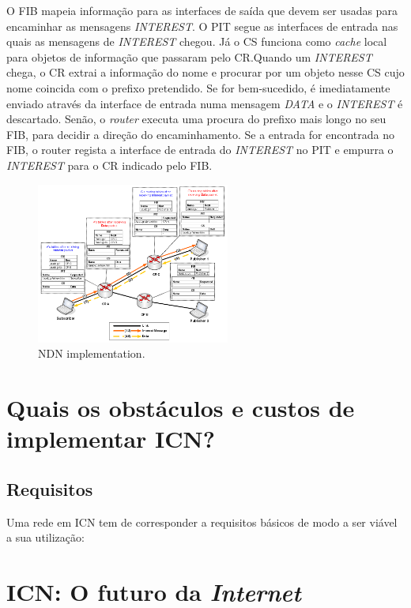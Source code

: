 \documentclass[conference]{IEEEtran}
\begin{document}
O FIB mapeia informa\c{c}\~{a}o para as interfaces de sa\'{i}da que devem ser usadas para encaminhar as mensagens \textit{INTEREST}. O PIT segue as interfaces de entrada nas quais as mensagens de \textit{INTEREST} chegou. J\'{a} o CS funciona como \textit{cache} local para objetos de informa\c{c}\~{a}o que passaram pelo CR.Quando um \textit{INTEREST} chega, o CR extrai a informa\c{c}\~{a}o do nome e procurar por um objeto nesse CS cujo nome coincida com o prefixo pretendido. Se for bem-sucedido, \'{e} imediatamente enviado atrav\'{e}s da interface de entrada numa mensagem \textit{DATA} e o \textit{INTEREST} \'{e} descartado. Sen\~{a}o, o \textit{router} executa uma procura do prefixo mais longo no seu FIB, para decidir a dire\c{c}\~{a}o do encaminhamento. Se a entrada for encontrada no FIB, o router regista a interface de entrada do \textit{INTEREST} no PIT e empurra o \textit{INTEREST} para o CR indicado pelo FIB.\\

\begin{figure}[h]
\centering
\includegraphics[width=2.5in]{ndn}
\caption{NDN implementation.}
\label{dona}
\end{figure}
\section{Quais os obst\'{a}culos e custos de implementar ICN?}

\subsection{Requisitos}

Uma rede em ICN tem de corresponder a requisitos b\'{a}sicos de modo a ser vi\'{a}vel a sua utiliza\c{c}\~{a}o:


\section{ICN: O futuro da \textit{Internet}}
\end{document}
